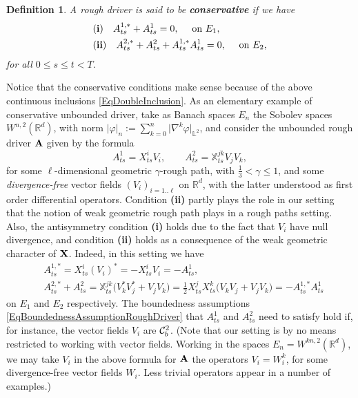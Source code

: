 \documentclass[11pt,a4paper]{amsart}
\newcommand{\RR}{\mathbb{R}}  \newcommand{\CC}{\mathbb{C}}  \newcommand{\LL}{\mathbb{L}}  \newcommand{\WW}{\mathbb{W}}
\newcommand{\bbX}{\mathbb{X}}
\renewcommand{\leq}{\leqslant}
\newtheorem{defn}[thm]{ \hspace{-0.3cm} {\sc Definition}}%
\numberwithin{equation}{section} %
\begin{document}
\begin{defn}
A rough driver is said to be \textbf{\emph{conservative}} if we have 
\begin{equation*}
\begin{split}
&{\bf (i)}\quad A^{1,*}_{ts} +A^1_{ts} = 0, \quad \textrm{ on } E_1, \\
&{\bf (ii)}\quad A^{2,*}_{ts} + A^2_{ts} + A_{ts}^{1,*}  A^1_{ts} = 0, \quad \textrm{ on } E_2,
\end{split}
\end{equation*}
for all $0\leq s\leq t<T$.
\end{defn}
Notice that the conservative conditions make sense because of the above continuous inclusions \eqref{EqDoubleInclusion}. As an elementary example of conservative unbounded driver, take as Banach spaces $E_n$ the Sobolev spaces $W^{n,2}(\RR^d)$, with norm $|\varphi|_n := \sum_{k=0}^n \big|\nabla^k\varphi\big|_{\LL^2}$, and consider the unbounded rough driver $\bf A$  given by the formula
\begin{equation}
\label{EqRoughDriverRoughPath}
A^1_{ts} = X^i_{ts}V_i,  \quad\quad A^2_{ts} = \bbX^{jk}_{ts}V_jV_k,
\end{equation}
for some $\ell$-dimensional geometric $\gamma$-rough path, with $\frac{1}{3}<\gamma\leq 1$, and some \emph{divergence-free} vector fields $(V_i)_{i=1..\ell}$ on $\RR^d$, with the latter understood as first order differential operators. Condition {\bf (ii)} partly plays the role in our setting that the notion of weak geometric rough path plays in a rough paths setting. Also, the antisymmetry condition {\bf (i)} holds due to the fact that $V_i$ have null divergence, and condition {\bf (ii)} holds as a consequence of the weak geometric character of ${\bf X}$. Indeed, in this setting we have
\begin{equation*}
\begin{split}
&A^{1,*}_{ts} = X^i_{ts}(V_i)^* = - X^i_{ts} V_i = -A^1_{ts}, \\
&A^{2,*}_{ts} + A^2_{ts} =  \bbX^{jk}_{ts}\big(V_k^*V_j^*+V_j V_k\big) = \frac1 2  X^j_{ts}X^k_{ts} \big(V_kV_j +V_j V_k\big) = - A^{1,*}_{ts} A^1_{ts}
\end{split}
\end{equation*}
on $E_1$ and $E_2$ respectively. The boundedness assumptions \eqref{EqBoundednessAssumptionRoughDriver} that $A^1_{ts}$ and $A^2_{ts}$ need to satisfy hold if, for instance, the vector fields $V_i$ are $\mathcal{C}^2_b$. (Note that our setting is by no means restricted to working with vector fields. Working in the spaces $E_n = W^{kn,2}(\RR^d)$, we may take $V_i$ in the above formula for $\bf A$ the operators $V_i=W_i^k$, for some divergence-free vector fields $W_i$. Less trivial operators appear in a number of examples.)
\end{document}
